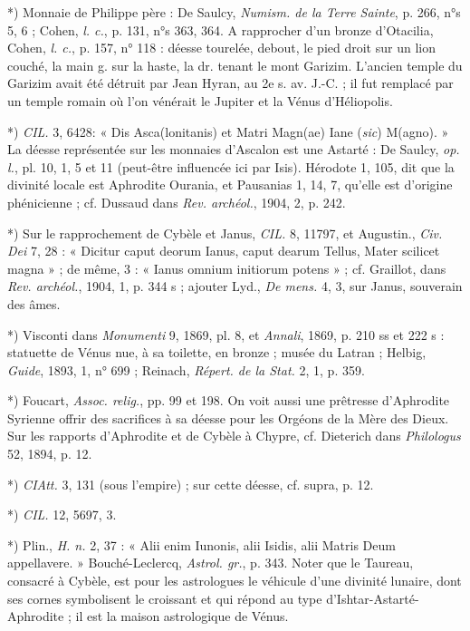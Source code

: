 \documentclass[a4paper, 11pt, oneside, polutonikogreek, french]{article}
\begin{document}
*) Monnaie de Philippe père : De Saulcy, \emph{Numism. de la Terre Sainte}, p. 266, n°s 5, 6 ; Cohen, \emph{l. c.}, p. 131, n°s 363, 364. A rapprocher d'un bronze d'Otacilia, Cohen, \emph{l. c.}, p. 157, n° 118 : déesse tourelée, debout, le pied droit sur un lion couché, la main g. sur la haste, la dr. tenant le mont Garizim. L'ancien temple du Garizim avait été détruit par Jean Hyran, au 2e s. av. J.-C. ; il fut remplacé par un temple romain où l'on vénérait le Jupiter et la Vénus d'Héliopolis.

*) \emph{CIL.} 3, 6428: « Dis Asca(lonitanis) et Matri Magn(ae) Iane (\emph{sic}) M(agno). » La déesse représentée sur les monnaies d'Ascalon est une Astarté : De Saulcy, \emph{op. l.}, pl. 10, 1, 5 et 11 (peut-être influencée ici par Isis). Hérodote 1, 105, dit que la divinité locale est Aphrodite Ourania, et Pausanias 1, 14, 7, qu'elle est d'origine phénicienne ; cf. Dussaud dans \emph{Rev. archéol.}, 1904, 2, p. 242.

*) Sur le rapprochement de Cybèle et Janus, \emph{CIL.} 8, 11797, et Augustin., \emph{Civ. Dei} 7, 28 : « Dicitur caput deorum Ianus, caput dearum Tellus, Mater scilicet magna » ; de même, 3 : « Ianus omnium initiorum potens » ; cf. Graillot, dans \emph{Rev. archéol.}, 1904, 1, p. 344 s ; ajouter Lyd., \emph{De mens.} 4, 3, sur Janus, souverain des âmes.

*) Visconti dans \emph{Monumenti} 9, 1869, pl. 8, et \emph{Annali}, 1869, p. 210 ss et 222 s : statuette de Vénus nue, à sa toilette, en bronze ; musée du Latran ; Helbig, \emph{Guide}, 1893, 1, n° 699 ; Reinach, \emph{Répert. de la Stat.} 2, 1, p. 359.

*) Foucart, \emph{Assoc. relig.}, pp. 99 et 198. On voit aussi une prêtresse d'Aphrodite Syrienne offrir des sacrifices à sa déesse pour les Orgéons de la Mère des Dieux. Sur les rapports d'Aphrodite et de Cybèle à Chypre, cf. Dieterich dans \emph{Philologus} 52, 1894, p. 12.

*) \emph{CIAtt.} 3, 131 (sous l'empire) ; sur cette déesse, cf. supra, p. 12.

*) \emph{CIL.} 12, 5697, 3.

*) Plin., \emph{H. n.} 2, 37 : « Alii enim Iunonis, alii Isidis, alii Matris Deum appellavere. » Bouché-Leclercq, \emph{Astrol. gr.}, p. 343. Noter que le Taureau, consacré à Cybèle, est pour les astrologues le véhicule d'une divinité lunaire, dont ses cornes symbolisent le croissant et qui répond au type d'Ishtar-Astarté-Aphrodite ; il est la maison astrologique de Vénus.
\end{document}
